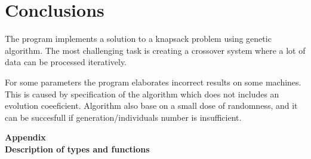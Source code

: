 \documentclass[12pt,a4paper,twoside]{article}
\begin{document}
\section{Conclusions}

The program implements a solution to a knapsack problem using genetic algorithm. The most challenging task is creating a crossover system where a lot of data can be processed iteratively.

For some parameters the program elaborates incorrect results on some machines. This is caused by specification of the algorithm which does not includes an evolution coeeficient. Algorithm also base on a small dose of randomness, and it can be succesfull if generation/individuals number is insufficient.





 
 
\cleardoublepage

\rule{0cm}{0cm}

\vfill

\begin{center}
\Huge\bfseries Appendix\\Description of types and functions\par
\end{center}

\vfill 

\rule{0cm}{0cm}
\end{document}
